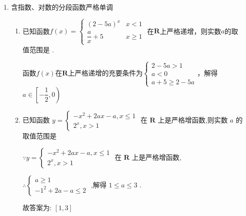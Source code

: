 \begin{enumerate}
    \item 含指数、对数的分段函数严格单调
    \begin{enumerate}
        \item 已知函数$f(x) = \left \{ \begin{array}{ll}
         (2-5a)^x & x < 1  \\
         \dfrac{a}{x} + 5 & x \geq 1
        \end{array}\right.$ 在$\mathbf{R}$上严格递增，则实数$a$的取值范围是\blkda{$\left[-\dfrac{1}{2}, 0\right)$} .
        \begin{jieda}
            函数$f(x)$在$\mathbf{R}$上严格递增的充要条件为$\left \{ \begin{array}{l}
             2-5a > 1  \\
             a < 0 \\
             a + 5 \geq 2 - 5a
        \end{array}\right.$，解得$a \in \left[-\dfrac{1}{2}, 0\right)$
        \end{jieda}
        
        \item 已知函数 $y = \left\{  \begin{matrix}  - {x}^{2} + {2ax} - a,x \leq  1 \\  {2}^{x},x > 1 \end{matrix}\right.$ 在 $\mathbf{R}$ 上是严格增函数,则实数 $a$ 的取值范围是\blkda{$[1, 3]$}
        \begin{jieda}
            $\because y = \left\{  \begin{matrix}  - {x}^{2} + {2ax} - a,x \leq  1 \\  {2}^{x},x > 1 \end{matrix}\right.$ 在 $\mathbf{R}$ 上是严格增函数,
            
            $\therefore \left\{  \begin{matrix} a \geq  1 \\   - {1}^{2} + {2a} - a \leq  2 \end{matrix}\right.$ ,解得 $1 \leq  a \leq  3$ .
            
            故答案为: $\left\lbrack  {1,3}\right\rbrack$
        \end{jieda}


\end{enumerate}
\end{enumerate}
